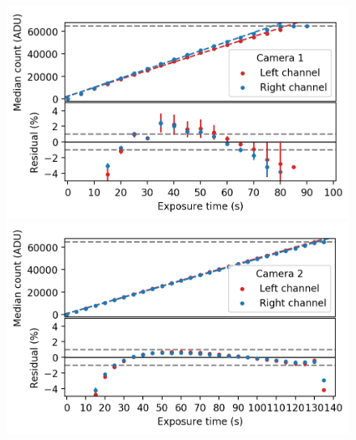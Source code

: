 \begin{colsection}
\begin{colsection}
\begin{figure}[p]
    \begin{center}
        \begin{minipage}[t]{0.47\textwidth}\vspace{10pt}
            \includegraphics[width=\linewidth]{images/detectors/lin_1.png}
        \end{minipage}
        \begin{minipage}[t]{0.47\textwidth}\vspace{10pt}
            \includegraphics[width=\linewidth]{images/detectors/lin_2.png}
        \end{minipage}


\end{center}
\end{figure}
\end{colsection}
\end{colsection}
